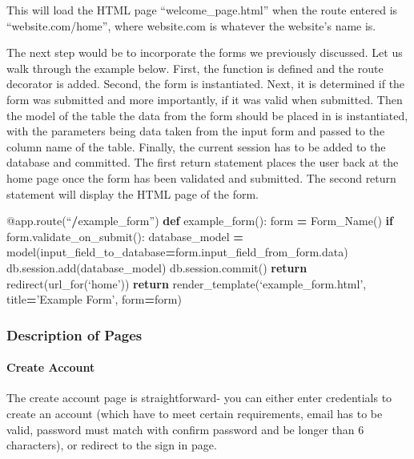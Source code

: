 \documentclass[]{book}
\newenvironment{Shaded}{\begin{snugshade}}{\end{snugshade}}
\newcommand{\KeywordTok}[1]{\textcolor[rgb]{0.13,0.29,0.53}{\textbf{#1}}}
\newcommand{\ControlFlowTok}[1]{\textcolor[rgb]{0.13,0.29,0.53}{\textbf{#1}}}
\newcommand{\OperatorTok}[1]{\textcolor[rgb]{0.81,0.36,0.00}{\textbf{#1}}}
\newcommand{\AttributeTok}[1]{\textcolor[rgb]{0.77,0.63,0.00}{#1}}
\newcommand{\NormalTok}[1]{#1}
\let\oldparagraph\paragraph
\renewcommand{\paragraph}[1]{\oldparagraph{#1}\mbox{}}
\begin{document}
This will load the HTML page ``welcome\_page.html'' when the route
entered is ``website.com/home'', where website.com is whatever the
website's name is.

The next step would be to incorporate the forms we previously discussed.
Let us walk through the example below. First, the function is defined
and the route decorator is added. Second, the form is instantiated.
Next, it is determined if the form was submitted and more importantly,
if it was valid when submitted. Then the model of the table the data
from the form should be placed in is instantiated, with the parameters
being data taken from the input form and passed to the column name of
the table. Finally, the current session has to be added to the database
and committed. The first return statement places the user back at the
home page once the form has been validated and submitted. The second
return statement will display the HTML page of the form.

\begin{Shaded}
\begin{Highlighting}[]
\AttributeTok{@app.route}\NormalTok{(“}\OperatorTok{/}\NormalTok{example_form”)}
\KeywordTok{def}\NormalTok{ example_form():}
\NormalTok{form }\OperatorTok{=}\NormalTok{ Form_Name()}
\ControlFlowTok{if}\NormalTok{ form.validate_on_submit():}
\NormalTok{              database_model }\OperatorTok{=}\NormalTok{ model(input_field_to_database}\OperatorTok{=}\NormalTok{form.input_field_from_form.data)}
\NormalTok{              db.session.add(database_model)}
\NormalTok{              db.session.commit()}
              \ControlFlowTok{return}\NormalTok{ redirect(url_for(‘home’))}
\ControlFlowTok{return}\NormalTok{ render_template(‘example_form.html’, title}\OperatorTok{=}\NormalTok{’Example Form’, form}\OperatorTok{=}\NormalTok{form)}
\end{Highlighting}
\end{Shaded}

\subsubsection{Description of Pages}\label{description-of-pages}

\paragraph{Create Account}\label{create-account}

The create account page is straightforward- you can either enter
credentials to create an account (which have to meet certain
requirements, email has to be valid, password must match with confirm
password and be longer than 6 characters), or redirect to the sign in
page.
\end{document}
